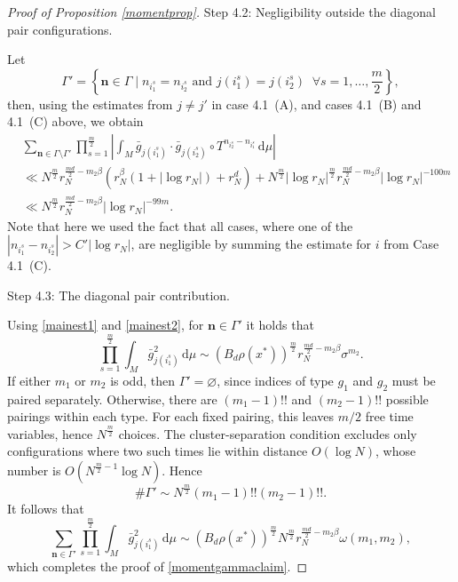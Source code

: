 \documentclass[10pt,a4paper]{amsart}
\renewcommand{\d}{\, \text{d}}
\begin{document}
\begin{proof}[Proof of Proposition \ref{momentprop}]
Step 4.2: Negligibility outside the diagonal pair configurations.

Let
\begin{equation*}
\Gamma'=\left\{\textbf{n} \in \Gamma \;|\; n_{i^s_1}=n_{i^s_2} \text{ and } j(i^s_1)=j(i^s_2) \;\; \forall s=1,\ldots,\frac{m}{2}\right\},
\end{equation*}
then, using the estimates from $j\neq j'$ in case 4.1~(A), and cases 4.1~(B) and 4.1~(C) above, we obtain
\begin{align*}
&\sum_{\textbf{n} \in \Gamma\setminus \Gamma'} \prod_{s=1}^{\frac{m}{2}} \left|\int_M \bar{g}_{j(i^s_1)} \cdot \bar{g}_{j(i^s_2)} \circ T^{n_{i^s_2}-n_{i^s_1}} \d\mu\right|\\
&\ll N^{\frac{m}{2}} r_N^{\frac{md}{2}-m_2 \beta}\left(r_N^\beta(1+|\log r_N|)+r_N^d \right)
+ N^{\frac{m}{2}} \left|\log r_N \right|^{\frac{m}{2}} r_N^{\frac{md}{2} - m_2 \beta} \left|\log r_N \right|^{-100m}\\
&\ll N^{\frac{m}{2}} r_N^{\frac{md}{2}-m_2 \beta} \left|\log r_N \right|^{-99m}.
\end{align*}
Note that here we used the fact that all cases, where one of the $|n_{i^s_1}-n_{i^s_2}|>C'|\log r_N|$, are negligible by summing the estimate for $i$ from Case 4.1~(C).




Step 4.3: The diagonal pair contribution.

Using \eqref{mainest1} and \eqref{mainest2}, for $\mathbf{n}\in \Gamma'$ it holds that
$$
\prod_{s=1}^{\frac{m}{2}} \int_M \bar{g}_{j(i^s_1)}^2 \d\mu\sim\left(B_d \rho(x^*)\right)^{\frac{m}{2}} r_N^{\frac{md}{2}-m_2\beta } \sigma^{m_2}.
$$
If either $m_1$ or $m_2$ is odd, then $\Gamma'=\varnothing$, since indices of type $g_1$ and $g_2$ must be paired separately. Otherwise, there are $(m_1-1)!!$ and $(m_2-1)!!$ possible pairings within each type. For each fixed pairing, this leaves $m/2$ free time variables, hence $N^{\frac{m}{2}}$ choices. The cluster-separation condition excludes only configurations where two such times lie within distance $O(\log N)$, whose number is $O(N^{\frac{m}{2}-1}\log N)$. Hence
$$\#\Gamma'\sim N^{\frac{m}{2}}(m_1-1)!!(m_2-1)!!.
$$
It follows that
$$
\sum_{\mathbf{n} \in \Gamma'} \prod_{s=1}^{\frac{m}{2}} \int_M \bar{g}_{j(i^s_1)}^2 \d\mu \sim \left(B_d \rho(x^*)\right)^{\frac{m}{2}} N^{\frac{m}{2}} r_N^{\frac{md}{2}-m_2\beta } \omega(m_1,m_2),
$$
which completes the proof of \eqref{momentgammaclaim}.
\end{proof}
\end{document}
